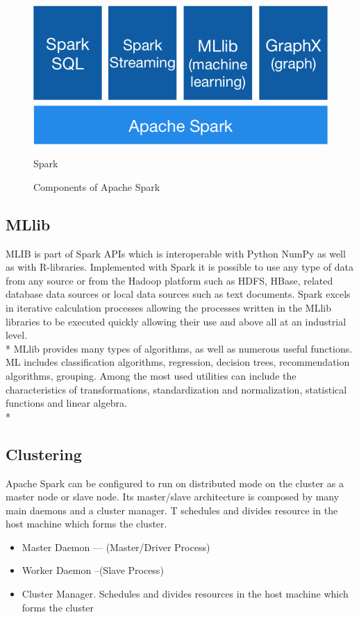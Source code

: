 \begin{figure}[H]
	\centering
	\includegraphics[scale=0.65]{figs/spark-components.png}
	\caption{Components of Apache Spark}Spark
	\label{fig:components-spark}
\end{figure}

\subsection{MLlib}

MLIB is part of Spark APIs which is interoperable with Python NumPy as well as with R-libraries. Implemented with Spark it is possible to use any type of data from any source or from the Hadoop platform such as HDFS, HBase, related database data sources or local data sources such as text documents.
Spark excels in iterative calculation processes allowing the processes written in the MLlib libraries to be executed quickly allowing their use and above all at an industrial level.\\*
MLlib provides many types of algorithms, as well as numerous useful functions. ML includes classification algorithms, regression, decision trees, recommendation algorithms, grouping. Among the most used utilities can include the characteristics of transformations, standardization and normalization, statistical functions and linear algebra.\\*

\subsection{Clustering}



Apache Spark can be configured to run on distributed mode on the cluster as a master node or slave node. Its master/slave architecture is composed by many main daemons and a cluster manager. T schedules and divides resource in the host machine which forms the cluster. 
\begin{itemize}

	\item Master Daemon — (Master/Driver Process)
	\item Worker Daemon –(Slave Process)
	\item Cluster Manager. Schedules and divides resources in the host machine which forms the cluster
\end{itemize}

